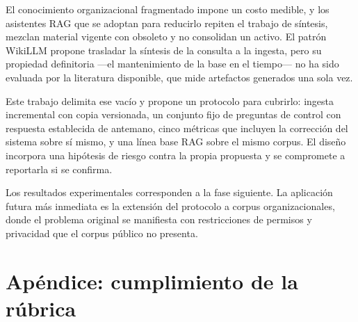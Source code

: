 \documentclass[11pt,letterpaper]{article}
\begin{document}
El conocimiento organizacional fragmentado impone un costo medible, y los asistentes RAG que se
adoptan para reducirlo repiten el trabajo de síntesis, mezclan material vigente con obsoleto y no
consolidan un activo. El patrón WikiLLM propone trasladar la síntesis de la consulta a la ingesta,
pero su propiedad definitoria —el mantenimiento de la base en el tiempo— no ha sido evaluada por la
literatura disponible, que mide artefactos generados una sola vez.

Este trabajo delimita ese vacío y propone un protocolo para cubrirlo: ingesta incremental con copia
versionada, un conjunto fijo de preguntas de control con respuesta establecida de antemano, cinco
métricas que incluyen la corrección del sistema sobre sí mismo, y una línea base RAG sobre el mismo
corpus. El diseño incorpora una hipótesis de riesgo contra la propia propuesta y se compromete a
reportarla si se confirma.

Los resultados experimentales corresponden a la fase siguiente. La aplicación futura más inmediata es
la extensión del protocolo a corpus organizacionales, donde el problema original se manifiesta con
restricciones de permisos y privacidad que el corpus público no presenta.

\section*{Apéndice: cumplimiento de la rúbrica}
\end{document}
